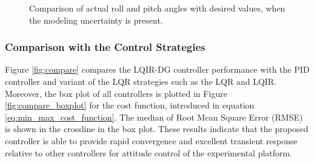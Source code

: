 \documentclass[peerreview]{IEEEtran}
\begin{document}
\begin{figure}[H]
	\caption{Comparison of actual roll and pitch angles with desired values, when the modeling uncertainty is present.}
	\label{fig:weight}
\end{figure}
\subsubsection{Comparison with the Control Strategies}
\noindent Figure \ref{fig:compare} compares the LQIR-DG controller performance with the PID controller and variant of the LQR strategies such as the LQR and LQIR. 
Moreover, the box plot of all controllers is plotted in Figure \ref{fig:compare_boxplot} for the cost function, introduced in equation \eqref{eq:min_max_cost_function}. %
The median of Root Mean Square Error (RMSE) is shown in the crossline in the box plot.
These results indicate that the proposed controller is able to provide rapid convergence and excellent transient response relative to other controllers for attitude control of the experimental platform.
\end{document}
